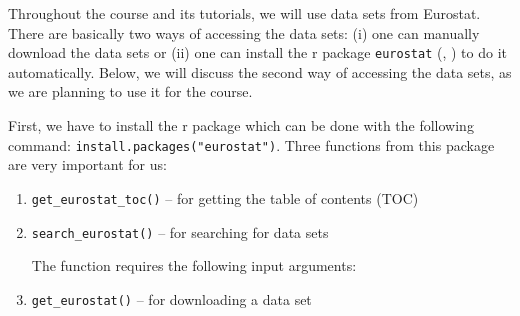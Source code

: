 Throughout the course and its tutorials, we will use data sets from Eurostat. There are basically two ways of accessing the data sets: (i) one can manually download the data sets or (ii) one can install the r package \texttt{eurostat} (\cite{LahtiHuovariKainuBiecek-2017}, \cite{eurostat-noyear}) to do it automatically. Below, we will discuss the second way of accessing the data sets, as we are planning to use it for the course.

First, we have to install the r package which can be done with the following command: \newline
\verb|install.packages("eurostat")|. Three functions from this package are very important for us:
\begin{enumerate}[label=\roman*.]
    \item \verb|get_eurostat_toc()| -- for getting the table of contents (TOC)

    \item \verb|search_eurostat()| -- for searching for data sets

          The function requires the following input arguments:

    \item \verb|get_eurostat()| -- for downloading a data set
\end{enumerate}

